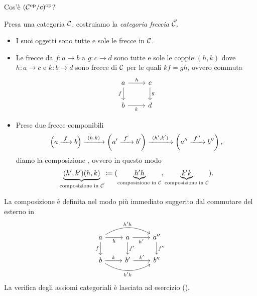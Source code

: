 \begin{esercizio}
Cos'è \((\mathcal C^\text{op}/c)^\text{op}\)?
\end{esercizio}

\begin{costruzione}
Presa una categoria \(\mathcal C\), costruiamo la {\em categoria freccia} \(\vec{\mathcal C}\).
\begin{itemize}
\item I suoi oggetti sono tutte e sole le frecce in \(\mathcal C\).
\item Le frecce da \(f : a \to b\) a \(g : c \to d\) sono tutte e sole le coppie \((h,k)\) dove \(h : a \to c\) e \(k : b \to d\) sono frecce di \(\mathcal C\) per le quali \(kf = gh\), ovvero commuta
\[\begin{tikzcd}
a \ar["f",d,swap] \ar["h",r] & c \ar["g",d] \\
b \ar["k",r,swap]            & d
\end{tikzcd}\]
\item Prese due frecce componibili
%
\[\left(a \xrightarrow{\ f\ } b\right) \xrightarrow{\ (h, k)\ }
\left(a' \xrightarrow{\ f'\ } b'\right) \xrightarrow{\ (h',k')\ }
\left(a'' \xrightarrow{\ f''\ } b''\right),\]
%
diamo la composizione , ovvero in questo modo
\[\underbrace{(h',k')(h, k)}_{\text{composizione in }\vec{\mathcal C}} \coloneq (\underbrace{h'h}_{\text{composizione in }\mathcal C}, \underbrace{k'k}_{\text{composizione in }\mathcal C}) .\]
\end{itemize}
%
La composizione è definita nel modo più immediato suggerito dal commutare del  esterno in
\[\begin{tikzcd}
a \ar["f",d,swap] \ar["h",r,swap] \ar["h'h",rr,bend left=30] &
a \ar["f'",d] \ar["h'",r,swap] &
a'' \ar["f''",d] \\
b \ar["k",r] \ar["k'k",rr,swap,bend right=30] & b' \ar["k'",r] & b''
\end{tikzcd}\]
La verifica degli assiomi categoriali è lasciata ad esercizio (\perlettore{}).
\end{costruzione}
